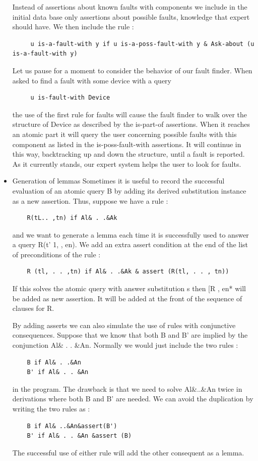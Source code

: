 \documentclass[14pt]{article}
\begin{document}
\begin{itemize}
Instead of assertions about known faults with components we include in 
the initial data base only assertions about possible faults, knowledge 
that expert should have. We then include the rule :
\begin{verbatim}
	 u is-a-fault-with y if u is-a-poss-fault-with y & Ask-about (u is-a-fault-with y) 
\end{verbatim}
Let us pause for a moment to consider the behavior of our fault finder.
When asked to find a fault with some device with a query
\begin{verbatim}
	 u is-fault-with Device
\end{verbatim}
the use of the first rule for faults will cause the fault finder to walk
over the structure of Device as described by the is-part-of assertions.
When it reaches an atomic part it will query the user concerning 
possible faults with this component as listed in the is-poss-fault-with 
assertions. It will continue in this way, backtracking up and down the 
structure, until a fault is reported. As it currently stands, our expert
system helps the user to look for faults. 

\item Generation of lemmas 
Sometimes it is useful to record the successful evaluation of an atomic 
query B by adding its derived substitution instance as a new assertion.
Thus, suppose we have a rule :
\begin{verbatim}
	R(tL.. ,tn) if Al& . .&Ak 
\end{verbatim}
and we want to generate a lemma each time it is successfully used to 
answer a query R(t' 1, , en). We add an extra assert condition at the 
end of the list of preconditions of the rule :
\begin{verbatim}
	R (tl, . . ,tn) if Al& . .&Ak & assert (R(tl, . . , tn))
\end{verbatim}
If this solves the atomic query with answer substitution s then [R , en*
will be added as new assertion. It will be added at the front of the 
sequence of clauses for R.

By adding asserts we can also simulate the use of rules with 
conjunctive consequences. Suppose that we know that both B and B' are 
implied by the conjunction Al\& . . \&An. Normally we would just 
include the two rules : 
\begin{verbatim}
	B if Al& . .&An
	B' if Al& . . &An 
\end{verbatim}
in the program. The drawback is that we need to solve Al\&..\&An twice 
in derivations where both B and B' are needed. We can avoid the
duplication by writing the two rules as :
\begin{verbatim}
	B if Al& ..&An&assert(B') 
	B' if Al& . . &An &assert (B) 
\end{verbatim}
The successful use of either rule will add the other consequent as a 
lemma. 


\end{itemize}
\end{document}
